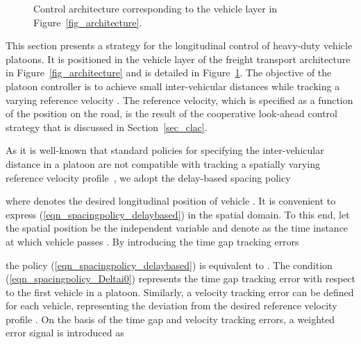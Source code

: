 \documentclass[journal]{IEEEtran}
\begin{document}
\begin{figure}
\begin{center}
\caption{Control architecture corresponding to the vehicle layer in Figure~\ref{fig_architecture}.}
\label{fig_architecture_lowerlayers}
\end{center}
\end{figure}

This section presents a strategy for the longitudinal control of heavy-duty vehicle platoons. It is positioned in the vehicle layer of the freight transport architecture in Figure~\ref{fig_architecture} and is detailed in Figure~\ref{fig_architecture_lowerlayers}. The objective of the platoon controller is to achieve small inter-vehicular distances while tracking a varying reference velocity . The reference velocity, which is specified as a function of the position on the road, is the result of the cooperative look-ahead control strategy that is discussed in Section~\ref{sec_clac}.

As it is well-known that standard policies for specifying the inter-vehicular distance in a platoon are not compatible with tracking a spatially varying reference velocity profile~\cite{alam_2013,besselink_2015b}, we adopt the delay-based spacing policy

where  denotes the desired longitudinal position of vehicle . It is convenient to express (\ref{eqn_spacingpolicy_delaybased}) in the spatial domain. To this end, let the spatial position  be the independent variable and denote  as the time instance at which vehicle  passes . By introducing the time gap tracking errors

the policy (\ref{eqn_spacingpolicy_delaybased}) is equivalent to . The condition (\ref{eqn_spacingpolicy_Deltai0}) represents the time gap tracking error with respect to the first vehicle in a platoon. Similarly, a velocity tracking error  can be defined for each vehicle, representing the deviation from the desired reference velocity profile . On the basis of the time gap and velocity tracking errors, a weighted error signal is introduced as
\end{document}
